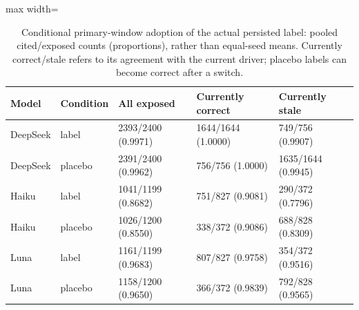 \begin{table}[tbp]
\caption{Conditional primary-window adoption of the actual persisted label: pooled cited/exposed counts (proportions), rather than equal-seed means. Currently correct/stale refers to its agreement with the current driver; placebo labels can become correct after a switch.}
\label{tab:adoption}
\centering\footnotesize
\setlength{\tabcolsep}{4pt}
\begin{adjustbox}{max width=\linewidth}
\begin{tabular}{lllll}
\toprule
Model & Condition & All exposed & Currently correct & Currently stale \\
\midrule
DeepSeek & label & 2393/2400 (0.9971) & 1644/1644 (1.0000) & 749/756 (0.9907) \\
DeepSeek & placebo & 2391/2400 (0.9962) & 756/756 (1.0000) & 1635/1644 (0.9945) \\
Haiku & label & 1041/1199 (0.8682) & 751/827 (0.9081) & 290/372 (0.7796) \\
Haiku & placebo & 1026/1200 (0.8550) & 338/372 (0.9086) & 688/828 (0.8309) \\
Luna & label & 1161/1199 (0.9683) & 807/827 (0.9758) & 354/372 (0.9516) \\
Luna & placebo & 1158/1200 (0.9650) & 366/372 (0.9839) & 792/828 (0.9565) \\
\bottomrule
\end{tabular}
\end{adjustbox}
\end{table}
